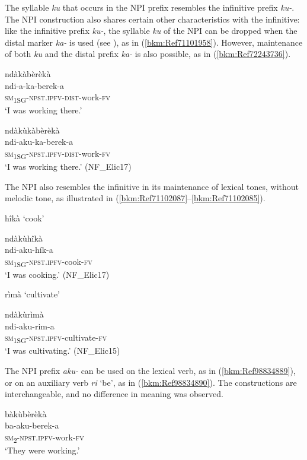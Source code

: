 The syllable \textit{ku} that occurs in the NPI prefix resembles the infinitive prefix \textit{ku-}. The NPI construction also shares certain other characteristics with the infinitive: like the infinitive prefix \textit{ku-}, the syllable \textit{ku} of the NPI can be dropped when the distal marker \textit{ka-} is used (see ), as in (\ref{bkm:Ref71101958}). However, maintenance of both \textit{ku} and the distal prefix \textit{ka-} is also possible, as in (\ref{bkm:Ref72243736}).

\ea
\label{bkm:Ref71101958}
\glll ndàkàbèrèkà\\
ndi-a-ka-berek-a\\
\textsc{sm}\textsubscript{1SG}-\textsc{npst}.\textsc{ipfv}-\textsc{dist}-work-\textsc{fv}\\
\glt ‘I was working there.’
\z

\ea
\label{bkm:Ref72243736}
\glll ndàkùkàbèrèkà\\
ndi-aku-ka-berek-a\\
\textsc{sm}\textsubscript{1SG}-\textsc{npst}.\textsc{ipfv}-\textsc{dist}-work-\textsc{fv}\\
\glt ‘I was working there.’ (NF\_Elic17)
\z

The NPI also resembles the infinitive in its maintenance of lexical tones, without melodic tone, as illustrated in (\ref{bkm:Ref71102087}--\ref{bkm:Ref71102085}).

\newpage
\ea
\label{bkm:Ref71102087}
\ea
hîkà ‘cook’

\ex
\glll ndàkùhîkà\\
ndi-aku-hík-a\\
\textsc{sm}\textsubscript{1SG}-\textsc{npst}.\textsc{ipfv}-cook-\textsc{fv}\\
\glt ‘I was cooking.’ (NF\_Elic17)
\z\z

\ea
\label{bkm:Ref71102085}
\ea
rìmà ‘cultivate’

\ex
\glll ndàkùrìmà\\
ndi-aku-rim-a\\
\textsc{sm}\textsubscript{1SG}-\textsc{npst}.\textsc{ipfv}-cultivate-\textsc{fv}\\
\glt ‘I was cultivating.’ (NF\_Elic15)
\z\z

The NPI prefix \textit{aku-} can be used on the lexical verb, as in (\ref{bkm:Ref98834889}), or on an auxiliary verb \textit{ri} ‘be’, as in (\ref{bkm:Ref98834890}). The constructions are interchangeable, and no difference in meaning was observed.

\ea
\label{bkm:Ref98834889}
\glll bàkùbèrèkà\\
ba-aku-berek-a\\
\textsc{sm}\textsubscript{2}-\textsc{npst}.\textsc{ipfv}-work-\textsc{fv}\\
\glt ‘They were working.’
\z


